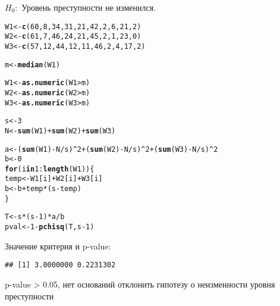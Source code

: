 \documentclass{article}\usepackage[]{graphicx}\usepackage[]{color}
\makeatletter
\newcommand{\hlnum}[1]{\textcolor[rgb]{0.686,0.059,0.569}{#1}}%
\newcommand{\hlopt}[1]{\textcolor[rgb]{0,0,0}{#1}}%
\newcommand{\hlstd}[1]{\textcolor[rgb]{0.345,0.345,0.345}{#1}}%
\newcommand{\hlkwa}[1]{\textcolor[rgb]{0.161,0.373,0.58}{\textbf{#1}}}%
\newcommand{\hlkwb}[1]{\textcolor[rgb]{0.69,0.353,0.396}{#1}}%
\newcommand{\hlkwd}[1]{\textcolor[rgb]{0.737,0.353,0.396}{\textbf{#1}}}%
\newenvironment{kframe}{%
 \def\at@end@of@kframe{}%
 \ifinner\ifhmode%
  \def\at@end@of@kframe{\end{minipage}}%
  \begin{minipage}{\columnwidth}%
 \fi\fi%
 \def\FrameCommand##1{\hskip\@totalleftmargin \hskip-\fboxsep
 \colorbox{shadecolor}{##1}\hskip-\fboxsep
     \hskip-\linewidth \hskip-\@totalleftmargin \hskip\columnwidth}%
 \MakeFramed {\advance\hsize-\width
   \@totalleftmargin\z@ \linewidth\hsize
   \@setminipage}}%
 {\par\unskip\endMakeFramed%
 \at@end@of@kframe}
\newenvironment{knitrout}{}{} %
\makeatother
\begin{document}
$H_0:$ Уровень преступности не изменился.
\begin{knitrout}
\color{fgcolor}\begin{kframe}
\begin{alltt}
\hlstd{W1} \hlkwb{<-} \hlkwd{c}\hlstd{(}\hlnum{60}\hlstd{,} \hlnum{8}\hlstd{,} \hlnum{34}\hlstd{,} \hlnum{31}\hlstd{,} \hlnum{21}\hlstd{,} \hlnum{42}\hlstd{,} \hlnum{2}\hlstd{,} \hlnum{6}\hlstd{,} \hlnum{21}\hlstd{,} \hlnum{2}\hlstd{)}
\hlstd{W2} \hlkwb{<-} \hlkwd{c}\hlstd{(}\hlnum{61}\hlstd{,} \hlnum{7}\hlstd{,} \hlnum{46}\hlstd{,} \hlnum{24}\hlstd{,} \hlnum{21}\hlstd{,} \hlnum{45}\hlstd{,} \hlnum{2}\hlstd{,} \hlnum{1}\hlstd{,} \hlnum{23}\hlstd{,} \hlnum{0}\hlstd{)}
\hlstd{W3} \hlkwb{<-} \hlkwd{c}\hlstd{(}\hlnum{57}\hlstd{,} \hlnum{12}\hlstd{,} \hlnum{44}\hlstd{,} \hlnum{12}\hlstd{,} \hlnum{11}\hlstd{,} \hlnum{46}\hlstd{,} \hlnum{2}\hlstd{,} \hlnum{4}\hlstd{,} \hlnum{17}\hlstd{,} \hlnum{2}\hlstd{)}

\hlstd{m} \hlkwb{<-} \hlkwd{median}\hlstd{(W1)}

\hlstd{W1} \hlkwb{<-} \hlkwd{as.numeric}\hlstd{(W1} \hlopt{>} \hlstd{m)}
\hlstd{W2} \hlkwb{<-} \hlkwd{as.numeric}\hlstd{(W2} \hlopt{>} \hlstd{m)}
\hlstd{W3} \hlkwb{<-} \hlkwd{as.numeric}\hlstd{(W3} \hlopt{>} \hlstd{m)}

\hlstd{s} \hlkwb{<-} \hlnum{3}
\hlstd{N} \hlkwb{<-} \hlkwd{sum}\hlstd{(W1)} \hlopt{+} \hlkwd{sum}\hlstd{(W2)} \hlopt{+} \hlkwd{sum}\hlstd{(W3)}

\hlstd{a} \hlkwb{<-} \hlstd{(}\hlkwd{sum}\hlstd{(W1)} \hlopt{-} \hlstd{N} \hlopt{/} \hlstd{s)}\hlopt{^}\hlnum{2} \hlopt{+} \hlstd{(}\hlkwd{sum}\hlstd{(W2)} \hlopt{-} \hlstd{N} \hlopt{/} \hlstd{s)}\hlopt{^}\hlnum{2} \hlopt{+} \hlstd{(}\hlkwd{sum}\hlstd{(W3)} \hlopt{-} \hlstd{N} \hlopt{/} \hlstd{s)}\hlopt{^}\hlnum{2}
\hlstd{b} \hlkwb{<-} \hlnum{0}
\hlkwa{for}\hlstd{(i} \hlkwa{in} \hlnum{1}\hlopt{:}\hlkwd{length}\hlstd{(W1)) \{}
  \hlstd{temp} \hlkwb{<-} \hlstd{W1[i]} \hlopt{+} \hlstd{W2[i]} \hlopt{+} \hlstd{W3[i]}
  \hlstd{b} \hlkwb{<-} \hlstd{b} \hlopt{+} \hlstd{temp} \hlopt{*} \hlstd{(s} \hlopt{-} \hlstd{temp)}
\hlstd{\}}

\hlstd{T} \hlkwb{<-} \hlstd{s} \hlopt{*} \hlstd{(s} \hlopt{-} \hlnum{1}\hlstd{)} \hlopt{*} \hlstd{a} \hlopt{/} \hlstd{b}
\hlstd{pval} \hlkwb{<-} \hlnum{1} \hlopt{-} \hlkwd{pchisq}\hlstd{(T, s} \hlopt{-} \hlnum{1}\hlstd{)}
\end{alltt}
\end{kframe}
\end{knitrout}
Значение критерия и p-value:
\begin{knitrout}
\color{fgcolor}\begin{kframe}
\begin{verbatim}
## [1] 3.0000000 0.2231302
\end{verbatim}
\end{kframe}
\end{knitrout}
p-value > 0.05, нет оснований отклонить гипотезу о неизменности уровня преступности
\end{document}
